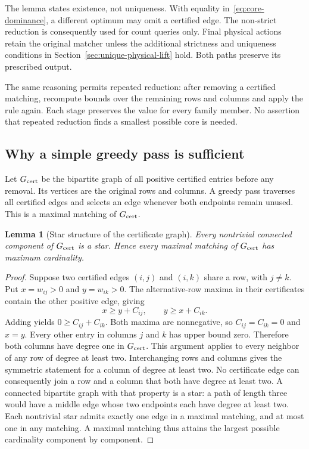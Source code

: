 \documentclass[11pt]{article}
\newtheorem{lemma}{Lemma}
\begin{document}
The lemma states existence, not uniqueness. With equality in~\eqref{eq:core-dominance}, a different optimum may omit a certified edge. The non-strict reduction is consequently used for count queries only. Final physical actions retain the original matcher unless the additional strictness and uniqueness conditions in Section~\ref{sec:unique-physical-lift} hold. Both paths preserve its prescribed output.

The same reasoning permits repeated reduction: after removing a certified matching, recompute bounds over the remaining rows and columns and apply the rule again. Each stage preserves the value for every family member. No assertion that repeated reduction finds a smallest possible core is needed.

\subsection{Why a simple greedy pass is sufficient}
Let $G_{\rm cert}$ be the bipartite graph of all positive certified entries before any removal. Its vertices are the original rows and columns. A greedy pass traverses all certified edges and selects an edge whenever both endpoints remain unused. This is a maximal matching of $G_{\rm cert}$.

\begin{lemma}[Star structure of the certificate graph]\label{lem:core-stars}
Every nontrivial connected component of $G_{\rm cert}$ is a star. Hence every maximal matching of $G_{\rm cert}$ has maximum cardinality.
\end{lemma}
\begin{proof}
Suppose two certified edges $(i,j)$ and $(i,k)$ share a row, with $j\ne k$. Put $x=w_{ij}>0$ and $y=w_{ik}>0$. The alternative-row maxima in their certificates contain the other positive edge, giving
\begin{equation}
x\ge y+C_{ij},\qquad y\ge x+C_{ik}.
\end{equation}
Adding yields $0\ge C_{ij}+C_{ik}$. Both maxima are nonnegative, so $C_{ij}=C_{ik}=0$ and $x=y$. Every other entry in columns $j$ and $k$ has upper bound zero. Therefore both columns have degree one in $G_{\rm cert}$. This argument applies to every neighbor of any row of degree at least two. Interchanging rows and columns gives the symmetric statement for a column of degree at least two. No certificate edge can consequently join a row and a column that both have degree at least two. A connected bipartite graph with that property is a star: a path of length three would have a middle edge whose two endpoints each have degree at least two. Each nontrivial star admits exactly one edge in a maximal matching, and at most one in any matching. A maximal matching thus attains the largest possible cardinality component by component.
\end{proof}
\end{document}
